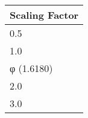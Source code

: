 \begin{tabular}{l}
\toprule
Scaling Factor \\
\midrule
0.5 \\
1.0 \\
φ (1.6180) \\
2.0 \\
3.0 \\
\bottomrule
\end{tabular}
